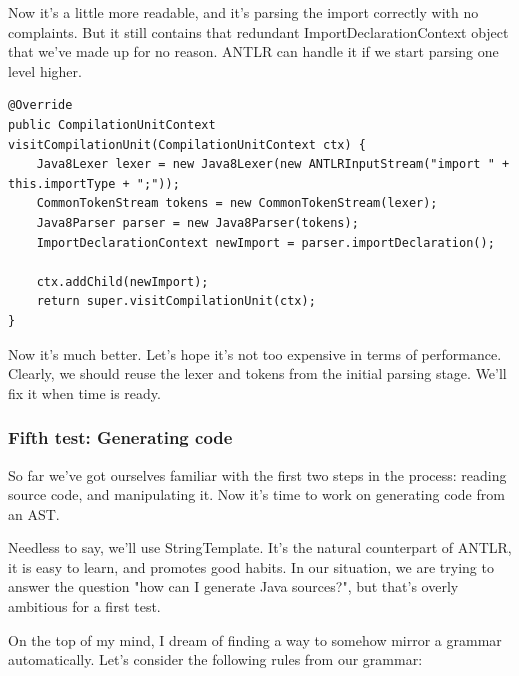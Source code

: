 \documentclass[11pt]{article}
\begin{document}
Now it's a little more readable, and it's parsing the import correctly with no complaints. But it still contains that redundant
ImportDeclarationContext object that we've made up for no reason. ANTLR can handle it if we start parsing one level higher.

\begin{verbatim}
@Override
public CompilationUnitContext visitCompilationUnit(CompilationUnitContext ctx) {
    Java8Lexer lexer = new Java8Lexer(new ANTLRInputStream("import " + this.importType + ";"));
    CommonTokenStream tokens = new CommonTokenStream(lexer);
    Java8Parser parser = new Java8Parser(tokens);
    ImportDeclarationContext newImport = parser.importDeclaration();

    ctx.addChild(newImport);
    return super.visitCompilationUnit(ctx);
}
\end{verbatim}

Now it's much better. Let's hope it's not too expensive in terms of performance. Clearly, we should reuse the lexer and tokens from the initial parsing stage. We'll fix it
when time is ready.

\subsubsection{Fifth test: Generating code}
\label{sec-1-3-5}

So far we've got ourselves familiar with the first two steps in the process: reading source code, and manipulating it. Now it's time to
work on generating code from an AST.

Needless to say, we'll use StringTemplate. It's the natural counterpart of ANTLR, it is easy to learn, and promotes good habits.
In our situation, we are trying to answer the question "how can I generate Java sources?", but that's overly ambitious for a
first test.

On the top of my mind, I dream of finding a way to somehow mirror a grammar automatically. Let's consider the following rules from our grammar:
\end{document}
